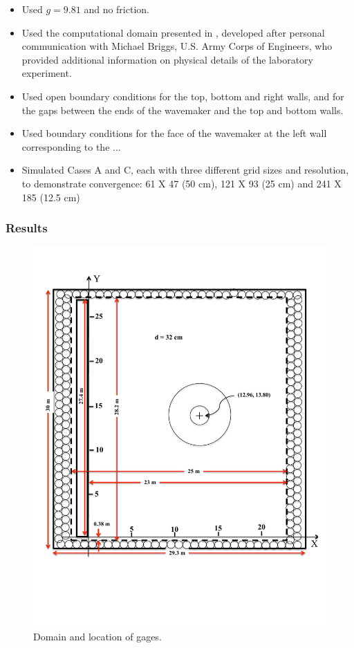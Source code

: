 \begin{itemize}
\item Used $g=9.81$ and no friction.
\item Used the computational domain presented in , developed after personal communication with Michael Briggs, U.S. Army Corps of Engineers, who  provided additional information on physical details of the laboratory experiment.
\item Used open boundary conditions for the top, bottom and right walls, and for the gaps between the ends of the wavemaker and the top and bottom walls.
\item Used boundary conditions for the face of the wavemaker at the left wall corresponding to the ...  
\item Simulated Cases A and C, each with three different grid sizes and resolution, to demonstrate convergence:  61 X 47 (50 cm), 121 X 93 (25 cm) and 241 X 185 (12.5 cm)
\end{itemize}

\subsubsection{Results}

\begin{figure}[ht]
\hfil\includegraphics[width=5.8in]{bp6/Domain.pdf}\hfil
\caption{\label{bp6Domain}
Domain and location of gages.
}
\end{figure}

